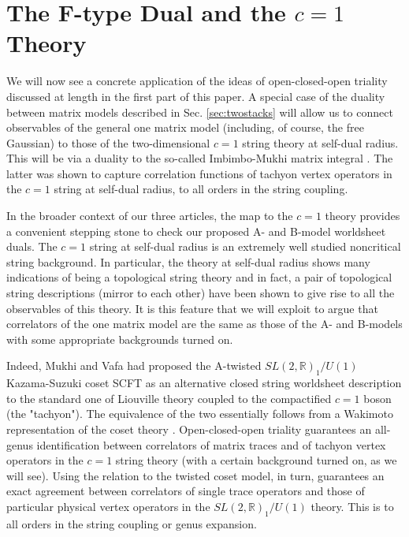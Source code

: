 \documentclass[english]{article}
\let\mb=\mathbb
\begin{document}



\section{The F-type Dual and the $c=1$ Theory}

We will now see a concrete application of the ideas of open-closed-open triality discussed at length in the first part of this paper. A special case of the duality between matrix models described in Sec. \ref{sec:twostacks} will allow us to connect observables of the general one matrix model (including, of course, the free Gaussian) to those of the two-dimensional $c=1$ string theory at self-dual radius. This will be via a duality to the so-called Imbimbo-Mukhi matrix integral \cite{ImbimboMukhi}. The latter was shown to capture correlation functions of tachyon vertex operators in the $c=1$ string at self-dual radius, to all orders in the string coupling. %

In the broader context of our three articles, the map to the $c=1$ theory provides a convenient stepping stone to check our proposed A- and B-model worldsheet duals. The $c=1$ string at self-dual radius is an extremely well studied noncritical string background. 
In particular, the theory at self-dual radius shows many indications of being a topological string theory and in fact, a pair of topological string descriptions (mirror to each other) have been shown to give rise to all the observables of this theory. It is this feature that we will exploit to argue that correlators of the one matrix model are the same as those of the A- and B-models with some appropriate backgrounds turned on. 

Indeed, Mukhi and Vafa had proposed \cite{MukhiVafa} the A-twisted $SL(2,\mb{R})_{1}/U(1)$ Kazama-Suzuki coset SCFT as an alternative closed string worldsheet description to the standard one of Liouville theory coupled to the compactified $c=1$ boson (the "tachyon"). The equivalence of the two essentially follows from a Wakimoto representation of the coset theory \cite{MukhiVafa, ashok2006topological}.  
Open-closed-open triality guarantees an all-genus identification between correlators of matrix traces and of tachyon vertex operators in the $c=1$ string theory (with a certain background turned on, as we will see). Using the relation to the twisted coset model, in turn, guarantees an exact agreement between correlators of single trace operators and those of particular physical vertex operators in the $SL(2,\mb{R})_{1}/U(1)$ theory. This is to all orders in the string coupling or genus expansion. 
\end{document}
